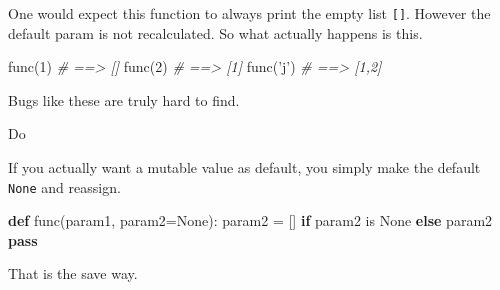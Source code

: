 \documentclass[ignorenonframetext,]{beamer}
\newenvironment{Shaded}{}{}
\newcommand{\KeywordTok}[1]{\textcolor[rgb]{0.00,0.44,0.13}{\textbf{{#1}}}}
\newcommand{\DecValTok}[1]{\textcolor[rgb]{0.25,0.63,0.44}{{#1}}}
\newcommand{\StringTok}[1]{\textcolor[rgb]{0.25,0.44,0.63}{{#1}}}
\newcommand{\CommentTok}[1]{\textcolor[rgb]{0.38,0.63,0.69}{\textit{{#1}}}}
\newcommand{\VariableTok}[1]{\textcolor[rgb]{0.10,0.09,0.49}{{#1}}}
\newcommand{\ControlFlowTok}[1]{\textcolor[rgb]{0.00,0.44,0.13}{\textbf{{#1}}}}
\newcommand{\OperatorTok}[1]{\textcolor[rgb]{0.40,0.40,0.40}{{#1}}}
\newcommand{\NormalTok}[1]{{#1}}
\begin{document}
\begin{frame}[fragile]

One would expect this function to always print the empty list
\texttt{{[}{]}}. However the default param is not recalculated. So what
actually happens is this.

\begin{Shaded}
\begin{Highlighting}[]
\NormalTok{func(}\DecValTok{1}\NormalTok{)  }\CommentTok{# ==> []}
\NormalTok{func(}\DecValTok{2}\NormalTok{)  }\CommentTok{# ==> [1]}
\NormalTok{func(}\StringTok{'j'}\NormalTok{) }\CommentTok{# ==> [1,2]}
\end{Highlighting}
\end{Shaded}

Bugs like these are truly hard to find.

\end{frame}

\begin{frame}[fragile]

\begin{block}{Do}

If you actually want a mutable value as default, you simply make the
default \texttt{None} and reassign.

\begin{Shaded}
\begin{Highlighting}[]
\KeywordTok{def} \NormalTok{func(param1, param2}\OperatorTok{=}\VariableTok{None}\NormalTok{):}
    \NormalTok{param2 }\OperatorTok{=} \NormalTok{[] }\ControlFlowTok{if} \NormalTok{param2 }\OperatorTok{is} \VariableTok{None} \ControlFlowTok{else} \NormalTok{param2}
    \ControlFlowTok{pass}
\end{Highlighting}
\end{Shaded}

That is the save way.

\end{block}

\end{frame}
\end{document}
